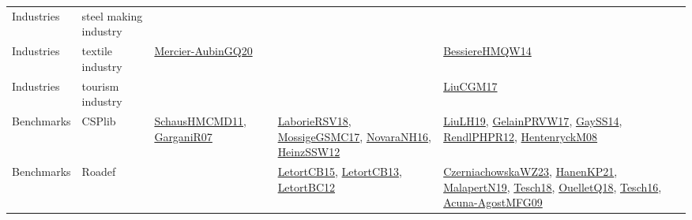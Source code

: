 {\begin{longtable}{lp{3cm}>{\raggedright}p{6cm}>{\raggedright}p{6cm}p{8cm}}
Industries & steel making industry &  &  & \\
Industries & textile industry & \href{papers/Mercier-AubinGQ20.pdf}{Mercier-AubinGQ20}\cite{Mercier-AubinGQ20} &  & \href{papers/BessiereHMQW14.pdf}{BessiereHMQW14}\cite{BessiereHMQW14}\\
Industries & tourism industry &  &  & \href{papers/LiuCGM17.pdf}{LiuCGM17}\cite{LiuCGM17}\\
Benchmarks & CSPlib & \href{articles/SchausHMCMD11.pdf}{SchausHMCMD11}\cite{SchausHMCMD11}, \href{papers/GarganiR07.pdf}{GarganiR07}\cite{GarganiR07} & \href{articles/LaborieRSV18.pdf}{LaborieRSV18}\cite{LaborieRSV18}, \href{papers/MossigeGSMC17.pdf}{MossigeGSMC17}\cite{MossigeGSMC17}, \href{articles/NovaraNH16.pdf}{NovaraNH16}\cite{NovaraNH16}, \href{articles/HeinzSSW12.pdf}{HeinzSSW12}\cite{HeinzSSW12} & \href{papers/LiuLH19.pdf}{LiuLH19}\cite{LiuLH19}, \href{papers/GelainPRVW17.pdf}{GelainPRVW17}\cite{GelainPRVW17}, \href{papers/GaySS14.pdf}{GaySS14}\cite{GaySS14}, \href{papers/RendlPHPR12.pdf}{RendlPHPR12}\cite{RendlPHPR12}, \href{papers/HentenryckM08.pdf}{HentenryckM08}\cite{HentenryckM08}\\
Benchmarks & Roadef &  & \href{articles/LetortCB15.pdf}{LetortCB15}\cite{LetortCB15}, \href{papers/LetortCB13.pdf}{LetortCB13}\cite{LetortCB13}, \href{papers/LetortBC12.pdf}{LetortBC12}\cite{LetortBC12} & \href{articles/CzerniachowskaWZ23.pdf}{CzerniachowskaWZ23}\cite{CzerniachowskaWZ23}, \href{papers/HanenKP21.pdf}{HanenKP21}\cite{HanenKP21}, \href{papers/MalapertN19.pdf}{MalapertN19}\cite{MalapertN19}, \href{papers/Tesch18.pdf}{Tesch18}\cite{Tesch18}, \href{papers/OuelletQ18.pdf}{OuelletQ18}\cite{OuelletQ18}, \href{papers/Tesch16.pdf}{Tesch16}\cite{Tesch16}, \href{papers/Acuna-AgostMFG09.pdf}{Acuna-AgostMFG09}\cite{Acuna-AgostMFG09}\\

\end{longtable}}
